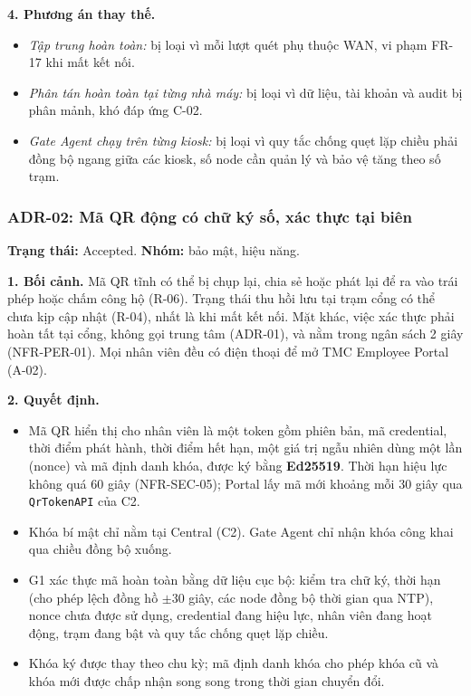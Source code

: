 \noindent\textbf{4. Phương án thay thế.}
\begin{itemize}
    \item \textit{Tập trung hoàn toàn:} bị loại vì mỗi lượt quét phụ thuộc WAN, vi phạm FR-17 khi mất kết nối.
    \item \textit{Phân tán hoàn toàn tại từng nhà máy:} bị loại vì dữ liệu, tài khoản và audit bị phân mảnh, khó đáp ứng C-02.
    \item \textit{Gate Agent chạy trên từng kiosk:} bị loại vì quy tắc chống quẹt lặp chiều phải đồng bộ ngang giữa các kiosk, số node cần quản lý và bảo vệ tăng theo số trạm.
\end{itemize}

\subsubsection{ADR-02: Mã QR động có chữ ký số, xác thực tại biên}\label{adr:02}
\textbf{Trạng thái:} Accepted. \textbf{Nhóm:} bảo mật, hiệu năng.

\noindent\textbf{1. Bối cảnh.} Mã QR tĩnh có thể bị chụp lại, chia sẻ hoặc phát lại để ra vào trái phép hoặc chấm công hộ (R-06). Trạng thái thu hồi lưu tại trạm cổng có thể chưa kịp cập nhật (R-04), nhất là khi mất kết nối. Mặt khác, việc xác thực phải hoàn tất tại cổng, không gọi trung tâm (ADR-01), và nằm trong ngân sách 2 giây (NFR-PER-01). Mọi nhân viên đều có điện thoại để mở TMC Employee Portal (A-02).

\noindent\textbf{2. Quyết định.}
\begin{itemize}
    \item Mã QR hiển thị cho nhân viên là một token gồm phiên bản, mã credential, thời điểm phát hành, thời điểm hết hạn, một giá trị ngẫu nhiên dùng một lần (nonce) và mã định danh khóa, được ký bằng \textbf{Ed25519}. Thời hạn hiệu lực không quá 60 giây (NFR-SEC-05); Portal lấy mã mới khoảng mỗi 30 giây qua \texttt{QrTokenAPI} của C2.
    \item Khóa bí mật chỉ nằm tại Central (C2). Gate Agent chỉ nhận khóa công khai qua chiều đồng bộ xuống.
    \item G1 xác thực mã hoàn toàn bằng dữ liệu cục bộ: kiểm tra chữ ký, thời hạn (cho phép lệch đồng hồ $\pm$30 giây, các node đồng bộ thời gian qua NTP), nonce chưa được sử dụng, credential đang hiệu lực, nhân viên đang hoạt động, trạm đang bật và quy tắc chống quẹt lặp chiều.
    \item Khóa ký được thay theo chu kỳ; mã định danh khóa cho phép khóa cũ và khóa mới được chấp nhận song song trong thời gian chuyển đổi.
\end{itemize}

